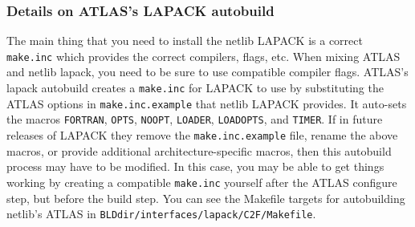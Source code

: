 \documentclass[11pt]{article}
\begin{document}
\subsubsection{Details on ATLAS's LAPACK autobuild}
\label{sec-lpdetails}
The main thing that you need to install the netlib LAPACK is a correct
{\tt make.inc} which provides the correct compilers, flags, etc.  When
mixing ATLAS and netlib lapack, you need to be sure to use compatible
compiler flags.  ATLAS's lapack autobuild creates a {\tt make.inc} for
LAPACK to use by substituting the ATLAS options in {\tt make.inc.example}
that netlib LAPACK provides.  It auto-sets the macros
{\tt FORTRAN}, {\tt OPTS}, {\tt NOOPT}, {\tt LOADER}, {\tt LOADOPTS},
and {\tt TIMER}.  If in future releases of LAPACK they remove the
{\tt make.inc.example} file, rename the above macros, or provide
additional architecture-specific macros, then this autobuild process
may have to be modified.  In this case, you may be able to get things
working by creating a compatible {\tt make.inc} yourself after
the ATLAS configure step, but before the build step.  You can
see the Makefile targets for autobuilding netlib's ATLAS in
{\tt BLDdir/interfaces/lapack/C2F/Makefile}.
\end{document}
